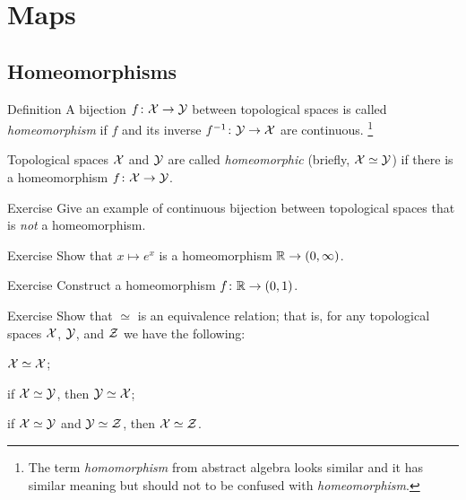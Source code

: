 \chapter{Maps}



\section{Homeomorphisms}

\begin{thm}{Definition}\label{def:cont-top}
A bijection $f\colon\mathcal{X}\to\mathcal{Y}$ between topological spaces 
is called \emph{homeomorphism} if $f$ and its inverse $f^{-1}\colon\mathcal{Y}\to\mathcal{X}$
are continuous.%
\footnote{The term \emph{homomorphism} from abstract algebra looks similar and it has similar meaning but should not to be confused with \emph{homeomorphism}.}

Topological spaces $\mathcal{X}$ and $\mathcal{Y}$ are called \emph{homeomorphic} (briefly, $\mathcal{X}\simeq\mathcal{Y}$) if there is a homeomorphism $f\colon\mathcal{X}\to\mathcal{Y}$.
\end{thm}


\begin{thm}{Exercise}
Give an example of continuous bijection between topological spaces that is \emph{not} a homeomorphism.
\end{thm}

\begin{thm}{Exercise}
Show that $x\mapsto e^x$ is a homeomorphism $\mathbb{R}\to (0,\infty)$.
\end{thm}

\begin{thm}{Exercise}
Construct a homeomorphism $f\colon\mathbb{R}\to (0,1)$.
\end{thm}

\begin{thm}{Exercise}
Show that $\simeq$ is an equivalence relation;
that is, for any topological spaces $\mathcal{X}$, $\mathcal{Y}$, and $\mathcal{Z}$ we have the following:
\begin{subthm}{}
$\mathcal{X}\simeq\mathcal{X}$;
\end{subthm}

\begin{subthm}{}
if $\mathcal{X}\simeq\mathcal{Y}$, then $\mathcal{Y}\simeq\mathcal{X}$;
\end{subthm}

\begin{subthm}{}
if $\mathcal{X}\simeq\mathcal{Y}$ and $\mathcal{Y}\simeq\mathcal{Z}$, then $\mathcal{X}\simeq\mathcal{Z}$.
\end{subthm}

\end{thm}

